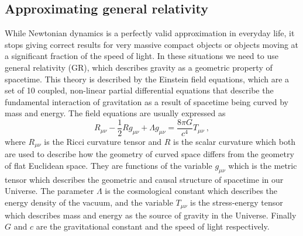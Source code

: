 \documentclass[english, oneside]{HYgradu}
\begin{document}
\subsection{Approximating general relativity}

While Newtonian dynamics is a perfectly valid approximation in everyday life, it stops giving correct results for very massive compact objects or objects moving at a significant fraction of the speed of light. In these situations we need to use general relativity (GR), which describes gravity as a geometric property of spacetime. This theory is described by the Einstein field equations, which are a set of 10 coupled, non-linear partial differential equations that describe the fundamental interaction of gravitation as a result of spacetime being curved by mass and energy. The field equations are usually expressed as
\begin{equation}
R_{\mu \nu} - \frac{1}{2}R g_{\mu \nu} + \Lambda g_{\mu \nu} = \frac{8 \pi G}{c^4} T_{\mu \nu} \ ,
\end{equation}
where $R_{\mu \nu}$ is the Ricci curvature tensor and $R$ is the scalar curvature which both are used to describe how the geometry of curved space differs from the geometry of flat Euclidean space. They are functions of the variable $g_{\mu \nu}$ which is the metric tensor which describes the geometric and causal structure of spacetime in our Universe. The parameter $\Lambda$ is the cosmological constant which describes the energy density of the vacuum, and the variable $T_{\mu \nu}$ is the stress-energy tensor which describes mass and energy as the source of gravity in the Universe. Finally $G$ and $c$ are the gravitational constant and the speed of light respectively.
\end{document}
